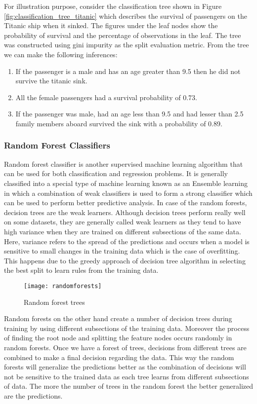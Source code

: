 \documentclass[11pt,openright]{report}
\begin{document}
For illustration purpose, consider the classification tree shown in Figure \ref{fig:classification_tree_titanic}  which describes the survival of passengers on the Titanic ship when it sinked. The figures under the leaf nodes show the probability of survival and the percentage of observations in the leaf. The tree was constructed using gini impurity as the split evaluation metric. From the tree we can make the following inferences: 
\begin{enumerate}
  \item If the passenger is a male and has an age greater than 9.5 then he did not survive the titanic sink.
  \item All the female passengers had a survival probability of 0.73.
  \item If the passenger was male, had an age less than 9.5 and had lesser than 2.5 family members aboard survived the sink with a probability of 0.89.
\end{enumerate}


\subsubsection {Random Forest Classifiers}
Random forest classifier is another supervised machine learning algorithm that can be used for both classification and regression problems. It is generally classified into a special type of machine learning known as an Ensemble learning in which a combination of weak classifiers is used to form a strong classifier which can be used to perform better predictive analysis. In case of the random forests, decision trees are the weak learners.  Although decision trees perform really well on some datasets, they are generally called weak learners as they tend to have high variance when they are trained on different subsections of the same data. Here, variance refers to the spread of the predictions and occurs when a model is sensitive to small changes in the training data which is the case of overfitting. This happens due to the greedy approach of decision tree algorithm in selecting the best split to learn rules from the training data.
  \begin{figure}
	\centering
	\texttt{[image: randomforests]}
	\caption{Random forest trees}
	\label{fig:random_forest_trees}
\end{figure} 


Random forests on the other hand create a number of decision trees during training by using different subsections of the training data. Moreover the process of finding the root node and splitting the feature nodes occurs randomly in random forests. Once we have a forest of trees, decisions from different trees are combined to make a final decision regarding the data. This way the random forests will generalize the predictions better as the combination of decisions will not be sensitive to the trained data as each tree learns from different subsections of data. The more the number of trees in the random forest the better generalized are the predictions.
\end{document}
